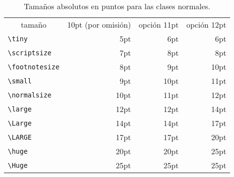 \begin{table}[!tbp]
\caption{Tamaños absolutos en puntos para las clases normales.}\label{tab:pointsizes}
\label{tab:sizes}
\begin{lined}{12cm}
\begin{tabular}{lrrr}
\multicolumn{1}{c}{tamaño} &
\multicolumn{1}{c}{10pt (por omisión) } &
           \multicolumn{1}{c}{opción 11pt}  &
           \multicolumn{1}{c}{opción 12pt}\\
\verb|\tiny|       & 5pt  & 6pt & 6pt\\
\verb|\scriptsize| & 7pt  & 8pt & 8pt\\
\verb|\footnotesize| & 8pt & 9pt & 10pt \\
\verb|\small|        & 9pt & 10pt & 11pt \\
\verb|\normalsize| & 10pt & 11pt & 12pt \\
\verb|\large|      & 12pt & 12pt & 14pt \\
\verb|\Large|      & 14pt & 14pt & 17pt \\
\verb|\LARGE|      & 17pt & 17pt & 20pt\\
\verb|\huge|       & 20pt & 20pt & 25pt\\
\verb|\Huge|       & 25pt & 25pt & 25pt\\
\end{tabular}

\bigskip
\end{lined}
\end{table}


